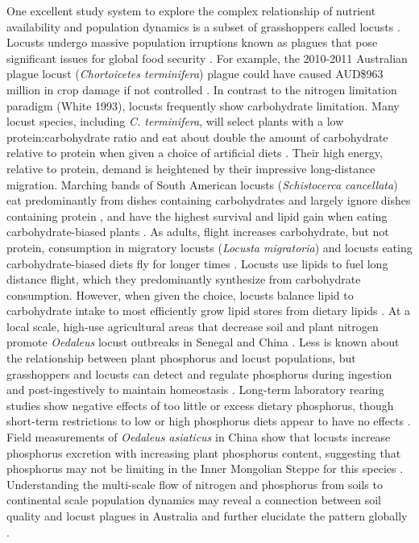 \documentclass[
]{article}
\begin{document}
One excellent study system to explore the complex relationship of
nutrient availability and population dynamics is a subset of
grasshoppers called locusts
\citep{cullen_molecules_2017, uvarov_grasshoppers_1977}. Locusts undergo
massive population irruptions known as plagues that pose significant
issues for global food security \citep{cease_living_2015}. For example,
the 2010-2011 Australian plague locust (\emph{Chortoicetes terminifera})
plague could have caused AUD\$963 million in crop damage if not
controlled \citep{millist_nicola_benefitcost_nodate}. In contrast to the
nitrogen limitation paradigm (White 1993), locusts frequently show
carbohydrate limitation. Many locust species, including \emph{C.
terminifera}, will select plants with a low protein:carbohydrate ratio
and eat about double the amount of carbohydrate relative to protein when
given a choice of artificial diets
\citep{behmer_insect_2009, brosemann_nutrient_2023, lawton_mismatched_2021, le_gall_global_2019}.
Their high energy, relative to protein, demand is heightened by their
impressive long-distance migration. Marching bands of South American
locusts (\emph{Schistocerca cancellata}) eat predominantly from dishes
containing carbohydrates and largely ignore dishes containing protein
\citep{cease_field_2023}, and have the highest survival and lipid gain
when eating carbohydrate-biased plants \citep{talal_plant_2020}. As
adults, flight increases carbohydrate, but not protein, consumption in
migratory locusts (\emph{Locusta migratoria}) and locusts eating
carbohydrate-biased diets fly for longer times \citep{talal_body_2024}.
Locusts use lipids to fuel long distance flight, which they
predominantly synthesize from carbohydrate consumption. However, when
given the choice, locusts balance lipid to carbohydrate intake to most
efficiently grow lipid stores from dietary lipids
\citep{talal_target_2024}. At a local scale, high-use agricultural areas
that decrease soil and plant nitrogen promote \emph{Oedaleus} locust
outbreaks in Senegal and China
\citep{cease_heavy_2012, giese_n_2013, le_gall_global_2019, word_soil-targeted_2019}.
Less is known about the relationship between plant phosphorus and locust
populations, but grasshoppers and locusts can detect and regulate
phosphorus during ingestion and post-ingestively to maintain homeostasis
\citep{cease_dietary_2016, zhang_grasshoppers_2014}. Long-term
laboratory rearing studies show negative effects of too little or excess
dietary phosphorus, though short-term restrictions to low or high
phosphorus diets appear to have no effects \citep{cease_dietary_2016}.
Field measurements of \emph{Oedaleus asiaticus} in China show that
locusts increase phosphorus excretion with increasing plant phosphorus
content, suggesting that phosphorus may not be limiting in the Inner
Mongolian Steppe for this species \citep{zhang_grasshoppers_2014}.
Understanding the multi-scale flow of nitrogen and phosphorus from soils
to continental scale population dynamics may reveal a connection between
soil quality and locust plagues in Australia and further elucidate the
pattern globally \citep{cease_how_2024, le_gall_global_2019}.
\end{document}
